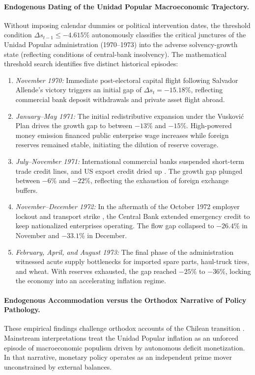 \paragraph{Endogenous Dating of the Unidad Popular Macroeconomic Trajectory.}
Without imposing calendar dummies or political intervention dates, the threshold condition $\Delta s_{t-1} \le -4.615\%$ autonomously classifies the critical junctures of the Unidad Popular administration (1970--1973) into the adverse solvency-growth state (reflecting conditions of central-bank insolvency). The mathematical threshold search identifies five distinct historical episodes:
\begin{enumerate}[leftmargin=*,itemsep=1pt]
    \item \emph{November 1970:} Immediate post-electoral capital flight following Salvador Allende's victory triggers an initial gap of $\Delta s_t = -15.18\%$, reflecting commercial bank deposit withdrawals and private asset flight abroad.
    \item \emph{January--May 1971:} The initial redistributive expansion under the Vuskovi\'c Plan drives the growth gap to between $-13\%$ and $-15\%$. High-powered money emission financed public enterprise wage increases while foreign reserves remained stable, initiating the dilution of reserve coverage.
    \item \emph{July--November 1971:} International commercial banks suspended short-term trade credit lines, and US export credit dried up \citep{Stallings1978,DeVylder1976}. The growth gap plunged between $-6\%$ and $-22\%$, reflecting the exhaustion of foreign exchange buffers.
    \item \emph{November--December 1972:} In the aftermath of the October 1972 employer lockout and transport strike \citep[see][]{Casals2021}, the Central Bank extended emergency credit to keep nationalized enterprises operating. The flow gap collapsed to $-26.4\%$ in November and $-33.1\%$ in December.
    \item \emph{February, April, and August 1973:} The final phase of the administration witnessed acute supply bottlenecks for imported spare parts, haul-truck tires, and wheat. With reserves exhausted, the gap reached $-25\%$ to $-36\%$, locking the economy into an accelerating inflation regime.
\end{enumerate}

\paragraph{Endogenous Accommodation versus the Orthodox Narrative of Policy Pathology.}
These empirical findings challenge orthodox accounts of the Chilean transition \citep{DornbuschEdwards1990,Edwards2024}. Mainstream interpretations treat the Unidad Popular inflation as an unforced episode of macroeconomic populism driven by autonomous deficit monetization. In that narrative, monetary policy operates as an independent prime mover unconstrained by external balances. 

